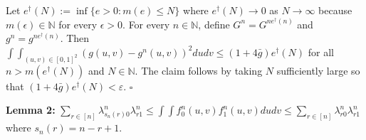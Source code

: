 \documentclass[12pt]{article}
\theoremstyle{definition}
\begin{document}
\begin{flushleft}
Let $e^{\dagger}(N) := \inf\{e > 0: m(e) \leq N\}$ where $e^{\dagger}(N) \to 0$ as $N\to \infty$ because $m(\epsilon) \in \mathbb{N}$ for every $\epsilon > 0$. For every $n \in \mathbb{N}$, define $G^{n} = G^{n e^{\dagger}(n)}$ and  $g^{n} = g^{n e^{\dagger}(n)}$. Then $\int\int_{(u,v) \in [0,1]^{2}}\left(g(u,v) - g^{n}(u,v)\right)^{2}dudv \leq \left(1+4\bar{g}\right)e^{\dagger}(N)$ for all $n > m(e^{\dagger}(N))$ and $N \in \mathbb{N}$. The claim follows by taking $N$ sufficiently large so that $\left(1+4\bar{g}\right)e^{\dagger}(N) < \varepsilon$.  $\square$
\end{flushleft}

\begin{flushleft}
\textbf{Lemma 2:} $ \sum_{r \in [n]}\lambda^{n}_{s_{n}(r)0}\lambda^{n}_{r1} \leq \int\int f^{n}_{0}(u,v)f^{n}_{1}(u,v)dudv \leq \sum_{r \in [n]}\lambda^{n}_{r0}\lambda^{n}_{r1}$ where $s_{n}(r) = n-r+1$. 
\end{flushleft}
\end{document}
